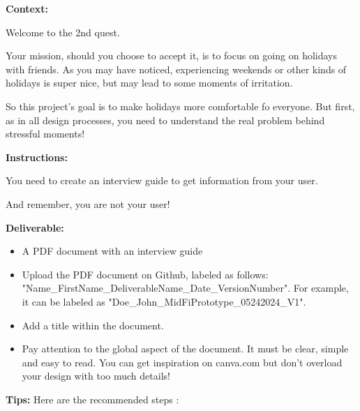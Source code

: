 \makeheaderfiles

\textbf{Context:}

Welcome to the 2nd quest.

Your mission, should you choose to accept it, is to focus on going on holidays with friends. As you may have noticed, experiencing weekends or other kinds of holidays is super nice, but may lead to some moments of irritation.

So this project's goal is to make holidays more comfortable fo everyone. But first, as in all design processes, you need to understand the real problem behind stressful moments!

\textbf{Instructions:}

You need to create an interview guide to get information from your user.

And remember, you are not your user!

\textbf{Deliverable:}

\begin{itemize}
\item A PDF document with an interview guide
\item Upload the PDF document on Github, labeled as follows: "Name\_FirstName\_DeliverableName\_Date\_VersionNumber". For example, it can be labeled as "Doe\_John\_MidFiPrototype\_05242024\_V1".
\item Add a title within the document.
\item Pay attention to the global aspect of the document. It must be clear, simple and easy to read. You can get inspiration on canva.com but don't overload your design with too much details!
\end{itemize}

\textbf{Tips:}
Here are the recommended steps :

